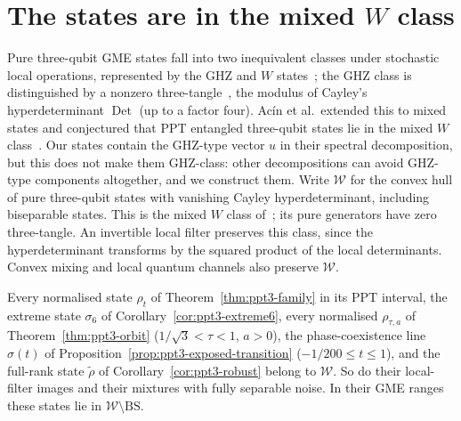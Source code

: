 \section{The states are in the mixed \texorpdfstring{$W$}{W} class}\label{sec:ppt3-w-class}

Pure three-qubit GME states fall into two inequivalent classes under stochastic local operations, represented by the GHZ
and $W$ states~\cite{DVC}; the GHZ class is distinguished by a nonzero three-tangle~\cite{CKW}, the modulus of Cayley's
hyperdeterminant $\operatorname{Det}$ (up to a factor four). Ac\'in et al.\ extended this to mixed states and conjectured that PPT entangled three-qubit states
lie in the mixed $W$ class~\cite{ABLS}. Our states contain the GHZ-type vector $u$ in their spectral decomposition, but
this does not make them GHZ-class: other decompositions can avoid GHZ-type components altogether, and we construct them.
Write $\mathcal W$ for the convex hull of pure three-qubit states with vanishing Cayley hyperdeterminant,
including biseparable states. This is the mixed $W$ class of~\cite{ABLS}; its pure generators have zero three-tangle.
An invertible local filter preserves this class, since the hyperdeterminant transforms by the squared product
of the local determinants. Convex mixing and local quantum channels also preserve $\mathcal W$.

\begin{theorem}\label{thm:ppt3-w-class}
Every normalised state $\rho_t$ of Theorem~\ref{thm:ppt3-family} in its PPT interval, the extreme state
$\sigma_6$ of Corollary~\ref{cor:ppt3-extreme6}, every normalised $\rho_{\tau,a}$ of
Theorem~\ref{thm:ppt3-orbit} ($1/\sqrt3<\tau<1$, $a>0$), the phase-coexistence line $\sigma(t)$ of
Proposition~\ref{prop:ppt3-exposed-transition} ($-1/200\le t\le1$), and the full-rank state $\tilde\rho$ of
Corollary~\ref{cor:ppt3-robust} belong to $\mathcal W$. So do their local-filter images and their mixtures
with fully separable noise. In their GME ranges these states lie in $\mathcal W\setminus\mathrm{BS}$.
\end{theorem}

